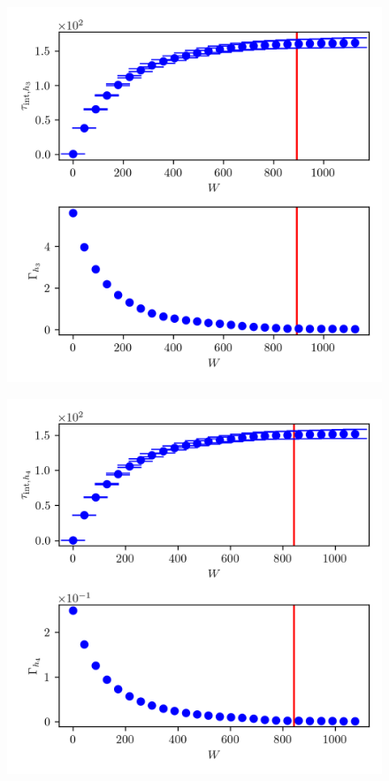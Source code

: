 \begin{figure}[ht!]
	\centering
	\includegraphics{UwerrTauIntTWalk2.png}
	\caption[]{}
	\label{fig:}
\end{figure}


\begin{figure}[ht!]
	\centering
	\includegraphics{UwerrTauIntTWalk3.png}
	\caption[]{}
	\label{fig:}
\end{figure}


